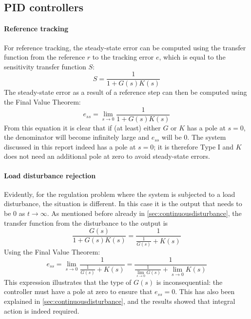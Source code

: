 \subsection*{PID controllers}
\paragraph{Reference tracking}
For reference tracking, the steady-state error can be computed using the transfer function from the reference $r$ to the tracking error $e$, which is equal to the sensitivity transfer function $S$:
$$ S = \frac{1}{1 + G(s)K(s)}$$
The steady-state error as a result of a reference step can then be computed using the Final Value Theorem:
$$e_{ss} = \lim_{s\to 0} \frac{1}{1 + G(s)K(s)}$$
From this equation it is clear that if (at least) either $G$ or $K$ has a pole at $s = 0$, the denominator will become infinitely large and $e_{ss}$ will be 0. The system discussed in this report indeed has a pole at $s = 0$; it is therefore Type I and $K$ does not need an additional pole at zero to avoid steady-state errors.   
\paragraph{Load disturbance rejection} 
Evidently, for the regulation problem where the system is subjected to a load disturbance, the situation is different. In this case it is the output that needs to be $0$ as $t \to \infty$. As mentioned before already in \cref{sec:continuousdisturbance}, the transfer function from the disturbance to the output is
$$ \frac{G(s)}{1 + G(s)K(s)} = \frac{1}{\frac{1}{G(s)} + K(s)}$$
Using the Final Value Theorem:
$$e_{ss} = \lim_{s\to 0} \frac{1}{\frac{1}{G(s)} + K(s)} = \frac{1}{\frac{1}{\lim_{s\to 0} G(s)} + \lim_{s \to 0}K(s)}$$
This expression illustrates that the type of $G(s)$ is inconsequential:  the controller must have a pole at zero to ensure that $e_{ss} = 0$. This has also been explained in \cref{sec:continuousdisturbance}, and the results showed that integral action is indeed required.
    
